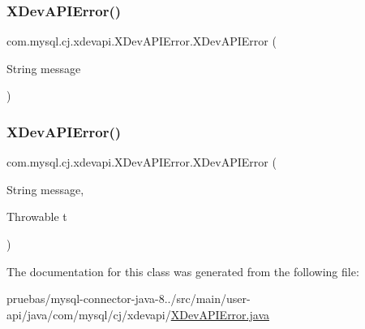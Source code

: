 \subsubsection{\texorpdfstring{X\+Dev\+A\+P\+I\+Error()}{XDevAPIError()}\hspace{0.1cm}{\footnotesize\ttfamily [1/2]}}
{\footnotesize\ttfamily com.\+mysql.\+cj.\+xdevapi.\+X\+Dev\+A\+P\+I\+Error.\+X\+Dev\+A\+P\+I\+Error (\begin{DoxyParamCaption}\item[{String}]{message }\end{DoxyParamCaption})}

\mbox{\label{classcom_1_1mysql_1_1cj_1_1xdevapi_1_1_x_dev_a_p_i_error_a243e94b6be20401c3a4ff7a9dc472a9c}} 
\subsubsection{\texorpdfstring{X\+Dev\+A\+P\+I\+Error()}{XDevAPIError()}\hspace{0.1cm}{\footnotesize\ttfamily [2/2]}}
{\footnotesize\ttfamily com.\+mysql.\+cj.\+xdevapi.\+X\+Dev\+A\+P\+I\+Error.\+X\+Dev\+A\+P\+I\+Error (\begin{DoxyParamCaption}\item[{String}]{message,  }\item[{Throwable}]{t }\end{DoxyParamCaption})}



The documentation for this class was generated from the following file\+:\begin{DoxyCompactItemize}
\item 
pruebas/mysql-\/connector-\/java-\/8../src/main/user-\/api/java/com/mysql/cj/xdevapi/\mbox{\hyperlink{_x_dev_a_p_i_error_8java}{X\+Dev\+A\+P\+I\+Error.\+java}}\end{DoxyCompactItemize}
